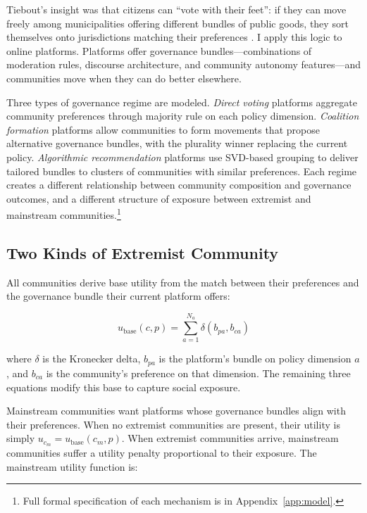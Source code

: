 \documentclass{article}
\begin{document}
Tiebout's insight was that citizens can ``vote with their feet'': if they can move freely among municipalities offering different bundles of public goods, they sort themselves onto jurisdictions matching their preferences \citep{tiebout1956pure}. I apply this logic to online platforms. Platforms offer governance bundles---combinations of moderation rules, discourse architecture, and community autonomy features---and communities move when they can do better elsewhere.

Three types of governance regime are modeled. \textit{Direct voting} platforms aggregate community preferences through majority rule on each policy dimension. \textit{Coalition formation} platforms allow communities to form movements that propose alternative governance bundles, with the plurality winner replacing the current policy. \textit{Algorithmic recommendation} platforms use SVD-based grouping to deliver tailored bundles to clusters of communities with similar preferences. Each regime creates a different relationship between community composition and governance outcomes, and a different structure of exposure between extremist and mainstream communities.\footnote{Full formal specification of each mechanism is in Appendix~\ref{app:model}.}

\subsection{Two Kinds of Extremist Community}

All communities derive base utility from the match between their preferences and the governance bundle their current platform offers:

\begin{equation}
u_{\text{base}}(c, p) = \sum_{a=1}^{N_a} \delta(b_{pa}, b_{ca})
\label{eq:base_fw}
\end{equation}

\noindent where $\delta$ is the Kronecker delta, $b_{pa}$ is the platform's bundle on policy dimension $a$, and $b_{ca}$ is the community's preference on that dimension. The remaining three equations modify this base to capture social exposure.

Mainstream communities want platforms whose governance bundles align with their preferences. When no extremist communities are present, their utility is simply $u_{c_m} = u_{\text{base}}(c_m, p)$. When extremist communities arrive, mainstream communities suffer a utility penalty proportional to their exposure. The mainstream utility function is:
\end{document}
